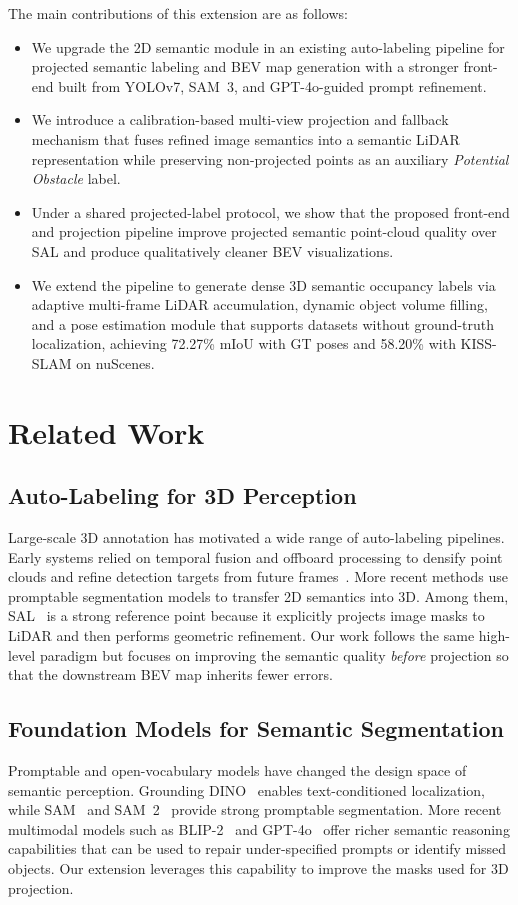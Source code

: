 \documentclass[conference]{IEEEtran}
\begin{document}
The main contributions of this extension are as follows:
\begin{itemize}
  \item We upgrade the 2D semantic module in an existing auto-labeling pipeline for projected semantic labeling and BEV map generation with a stronger front-end built from YOLOv7, SAM~3, and GPT-4o-guided prompt refinement.
  \item We introduce a calibration-based multi-view projection and fallback mechanism that fuses refined image semantics into a semantic LiDAR representation while preserving non-projected points as an auxiliary \emph{Potential Obstacle} label.
  \item Under a shared projected-label protocol, we show that the proposed front-end and projection pipeline improve projected semantic point-cloud quality over SAL and produce qualitatively cleaner BEV visualizations.
  \item We extend the pipeline to generate dense 3D semantic occupancy labels via adaptive multi-frame LiDAR accumulation, dynamic object volume filling, and a pose estimation module that supports datasets without ground-truth localization, achieving 72.27\% mIoU with GT poses and 58.20\% with KISS-SLAM on nuScenes.
\end{itemize}

\section{Related Work}
\subsection{Auto-Labeling for 3D Perception}
Large-scale 3D annotation has motivated a wide range of auto-labeling pipelines. Early systems relied on temporal fusion and offboard processing to densify point clouds and refine detection targets from future frames~\cite{qi_offboard3d}. More recent methods use promptable segmentation models to transfer 2D semantics into 3D. Among them, SAL~\cite{sal} is a strong reference point because it explicitly projects image masks to LiDAR and then performs geometric refinement. Our work follows the same high-level paradigm but focuses on improving the semantic quality \emph{before} projection so that the downstream BEV map inherits fewer errors.

\subsection{Foundation Models for Semantic Segmentation}
Promptable and open-vocabulary models have changed the design space of semantic perception. Grounding DINO~\cite{tbd_groundingdino} enables text-conditioned localization, while SAM~\cite{tbd_sam} and SAM~2~\cite{tbd_sam2video} provide strong promptable segmentation. More recent multimodal models such as BLIP-2~\cite{blip2} and GPT-4o~\cite{gpt4o_systemcard} offer richer semantic reasoning capabilities that can be used to repair under-specified prompts or identify missed objects. Our extension leverages this capability to improve the masks used for 3D projection.
\end{document}
